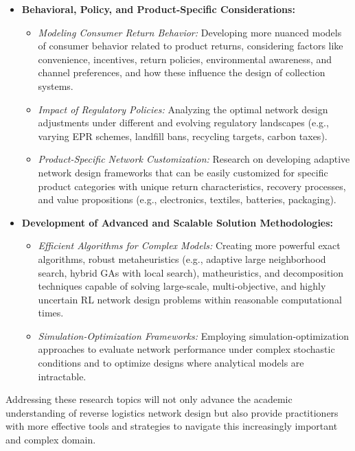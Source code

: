 \begin{itemize}
    \item \textbf{Behavioral, Policy, and Product-Specific Considerations:}
        \begin{itemize}
            \item \textit{Modeling Consumer Return Behavior:} Developing more nuanced models of consumer behavior related to product returns, considering factors like convenience, incentives, return policies, environmental awareness, and channel preferences, and how these influence the design of collection systems.
            \item \textit{Impact of Regulatory Policies:} Analyzing the optimal network design adjustments under different and evolving regulatory landscapes (e.g., varying EPR schemes, landfill bans, recycling targets, carbon taxes).
            \item \textit{Product-Specific Network Customization:} Research on developing adaptive network design frameworks that can be easily customized for specific product categories with unique return characteristics, recovery processes, and value propositions (e.g., electronics, textiles, batteries, packaging).
        \end{itemize}

    \item \textbf{Development of Advanced and Scalable Solution Methodologies:}
        \begin{itemize}
            \item \textit{Efficient Algorithms for Complex Models:} Creating more powerful exact algorithms, robust metaheuristics (e.g., adaptive large neighborhood search, hybrid GAs with local search), matheuristics, and decomposition techniques capable of solving large-scale, multi-objective, and highly uncertain RL network design problems within reasonable computational times.
            \item \textit{Simulation-Optimization Frameworks:} Employing simulation-optimization approaches to evaluate network performance under complex stochastic conditions and to optimize designs where analytical models are intractable.
        \end{itemize}
\end{itemize}
Addressing these research topics will not only advance the academic understanding of reverse logistics network design but also provide practitioners with more effective tools and strategies to navigate this increasingly important and complex domain.